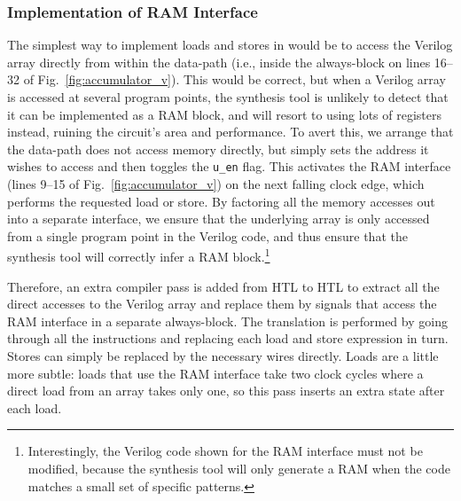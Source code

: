\subsubsection{Implementation of RAM Interface}\label{sec:algorithm:optimisation:ram}
The simplest way to implement loads and stores in \vericert{} would be to access
the Verilog array directly from within the data-path (i.e., inside the
always-block on lines 16--32 of Fig.~\ref{fig:accumulator_v}). This would be
correct, but when a Verilog array is accessed at several program points, the
synthesis tool is unlikely to detect that it can be implemented as a RAM block,
and will resort to using lots of registers instead, ruining the circuit's area
and performance.  To avert this, we arrange that the data-path does not access
memory directly, but simply sets the address it wishes to access and then
toggles the \texttt{u\_en} flag. This activates the RAM interface (lines 9--15
of Fig.~\ref{fig:accumulator_v}) on the next falling clock edge, which performs
the requested load or store. By factoring all the memory accesses out into a
separate interface, we ensure that the underlying array is only accessed from a
single program point in the Verilog code, and thus ensure that the synthesis
tool will correctly infer a RAM block.\footnote{Interestingly, the Verilog code
  shown for the RAM interface must not be modified, because the synthesis tool
  will only generate a RAM when the code matches a small set of specific
  patterns.}


Therefore, an extra compiler pass is added from HTL to HTL to extract all the
direct accesses to the Verilog array and replace them by signals that access the
RAM interface in a separate always-block. The translation is performed by going
through all the instructions and replacing each load and store expression in
turn.  Stores can simply be replaced by the necessary wires directly. Loads are
a little more subtle: loads that use the RAM interface take two clock cycles
where a direct load from an array takes only one, so this pass inserts an extra
state after each load.

